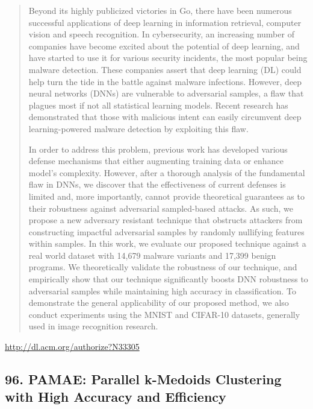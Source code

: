 \documentclass{article}
\begin{document}
\begin{quote}
Beyond its highly publicized victories in Go, there have been numerous successful applications of deep learning in information retrieval, computer vision and speech recognition. In cybersecurity, an increasing number of companies have become excited about the potential of deep learning, and have started to use it for various security incidents, the most popular being malware detection. These companies assert that deep learning (DL) could help turn the tide in the battle against malware infections. However, deep neural networks (DNNs) are vulnerable to adversarial samples, a flaw that plagues most if not all statistical learning models. Recent research has demonstrated that those with malicious intent can easily circumvent deep learning-powered malware detection by exploiting this flaw.







  In order to address this problem, previous work has developed various defense mechanisms that either augmenting training data or enhance model’s complexity. However, after a thorough analysis of the fundamental flaw in DNNs, we discover that the effectiveness of current defenses is limited and, more importantly, cannot provide theoretical guarantees as to their robustness against adversarial sampled-based attacks. As such, we propose a new adversary resistant technique that obstructs attackers from constructing impactful adversarial samples by randomly nullifying features within samples. In this work, we evaluate our proposed technique against a real world dataset with 14,679 malware variants and 17,399 benign programs. We theoretically validate the robustness of our technique, and empirically show that our technique significantly boosts DNN robustness to adversarial samples while maintaining high accuracy in classification. To demonstrate the general applicability of our proposed method, we also conduct experiments using the MNIST and CIFAR-10 datasets, generally used in image recognition research.
\end{quote}

\href{http://dl.acm.org/authorize?N33305}{http://dl.acm.org/authorize?N33305}

\subsection{96. PAMAE: Parallel k-Medoids Clustering with High Accuracy and Efficiency}
\end{document}
